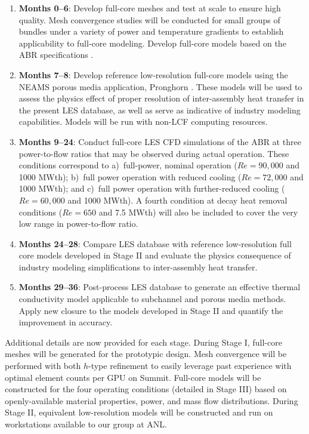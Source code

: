 \begin{enumerate}[label=\Roman*]
\item {\bf Months 0--6}: Develop full-core meshes and test at scale to ensure high quality. Mesh convergence studies will be conducted for small groups of bundles under a variety of power and temperature gradients to establish applicability to full-core modeling. Develop full-core models based on the ABR specifications \cite{abr}.
\item {\bf Months 7--8}: Develop reference low-resolution full-core models using the NEAMS porous media application, Pronghorn \cite{novak2021b}. These models will be used to assess the physics effect of proper resolution of inter-assembly heat transfer in the present LES database, as well as serve as indicative of industry modeling capabilities. Models will be run with non-LCF computing resources.
\item {\bf Months 9--24}: Conduct full-core LES CFD simulations of the ABR at three power-to-flow ratios that may be observed during actual operation. These conditions correspond to a)~full-power, nominal operation (\(Re=90,000\) and 1000 MWth); b)~full power operation with reduced cooling (\(Re=72,000\) and 1000 MWth); and c)~full power operation with further-reduced cooling (\(Re=60,000\) and 1000 MWth). A fourth condition at decay heat removal conditions (\(Re=650\) and 7.5 MWth) will also be included to cover the very low range in power-to-flow ratio.
\item {\bf Months 24--28}: Compare LES database with reference low-resolution full core models developed in Stage II and evaluate the physics consequence of industry modeling simplifications to inter-assembly heat transfer.
\item {\bf Months 29--36}: Post-process LES database to generate an effective thermal conductivity model applicable to subchannel and porous media methods. Apply new closure to the models developed in Stage II and quantify the improvement in accuracy. 
\end{enumerate}

Additional details are now provided for each stage. During Stage I, full-core meshes will be generated for the prototypic design. Mesh convergence will be performed with both \(h\)-type refinement to easily leverage past experience with optimal element counts per GPU on Summit. Full-core models will be constructed for the four operating conditions (detailed in Stage III) based on openly-available material properties, power, and mass flow distributions. During Stage II, equivalent low-resolution models will be constructed and run on workstations available to our group at ANL. 

